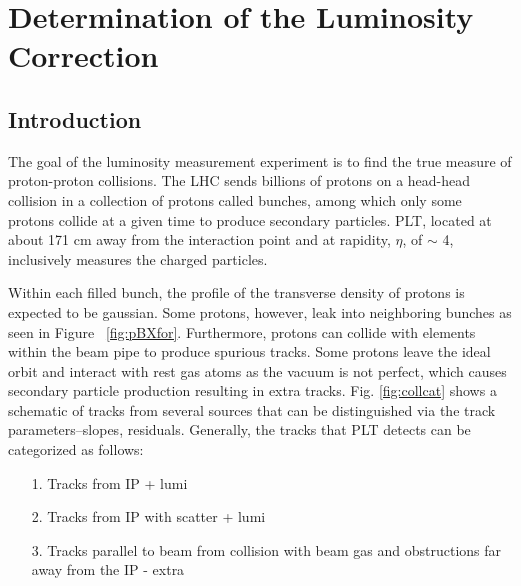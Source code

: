 \chapter{Determination of the Luminosity Correction} \label{ch:Correction}

\section{Introduction} \label{sec:corrIntro}
The goal of the luminosity measurement experiment is to find the true measure of proton-proton collisions. The LHC sends billions of protons on a head-head collision in a collection of protons called bunches, among which only some protons collide at a given time to produce secondary particles. PLT, located at about 171 cm away from the interaction point and at rapidity, $\eta$,  of $\sim$ 4, inclusively measures the charged particles. 

Within each filled bunch, the profile of the transverse density of protons is expected to be gaussian. Some protons, however, leak into neighboring bunches as seen in Figure ~\ref{fig:pBXfor}. Furthermore, protons can collide with elements within the beam pipe to produce spurious tracks. Some protons leave the ideal orbit and interact with rest gas atoms as the vacuum is not perfect, which causes secondary particle production resulting in extra tracks. 
Fig. \ref{fig:collcat} shows a schematic of tracks from several sources that can be distinguished via the track parameters--slopes, residuals. Generally, the tracks that PLT detects can be categorized as follows:


\begin{itemize}
    \item [1.] Tracks from IP   {\hfill + lumi}
    \item [2.] Tracks from IP with scatter  {\hfill + lumi}
    \item [3.] Tracks parallel to beam from collision with beam gas and obstructions far away from the IP    {\hfill - extra}
\end{itemize}







